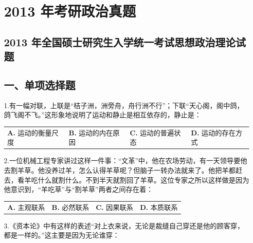 \documentclass[UTF8,11pt]{ctexart}
\begin{document}
\section*{2013 年考研政治真题}
\subsection*{2013 年全国硕士研究生入学统一考试思想政治理论试题}

\subsection*{一、单项选择题}

1.有一幅对联，上联是“桔子洲，洲旁舟，舟行洲不行”；下联“天心阁，阁中鸽，鸽飞阁不飞。”这形象地说明了运动和静止是相互依存的，静止是：


\begin{center}\begin{tabular}{>{\raggedright\arraybackslash}p{\dimexpr(\linewidth-8\tabcolsep)/4\relax}>{\raggedright\arraybackslash}p{\dimexpr(\linewidth-8\tabcolsep)/4\relax}>{\raggedright\arraybackslash}p{\dimexpr(\linewidth-8\tabcolsep)/4\relax}>{\raggedright\arraybackslash}p{\dimexpr(\linewidth-8\tabcolsep)/4\relax}}
\textbf{A.} 运动的衡量尺度 & \textbf{B.} 运动的内在原因 & \textbf{C.} 运动的普遍状态 & \textbf{D.} 运动的存在方式\\[.35em]\end{tabular}\end{center}

2.一位机械工程专家讲过这样一件事：“文革”中，他在农场劳动，有一天领导要他去割羊草。他没养过羊，怎么认得羊草呢？但脑子一转办法就来了。他把羊都赶去，看羊吃什么就割什么。不到半天就割回了羊草。这位专家之所以这样做是因为他意识到，“羊吃草”与“割羊草”两者之间存在着：


\begin{center}\begin{tabular}{>{\raggedright\arraybackslash}p{\dimexpr(\linewidth-8\tabcolsep)/4\relax}>{\raggedright\arraybackslash}p{\dimexpr(\linewidth-8\tabcolsep)/4\relax}>{\raggedright\arraybackslash}p{\dimexpr(\linewidth-8\tabcolsep)/4\relax}>{\raggedright\arraybackslash}p{\dimexpr(\linewidth-8\tabcolsep)/4\relax}}
\textbf{A.} 主观联系 & \textbf{B.} 必然联系 & \textbf{C.} 因果联系 & \textbf{D.} 本质联系\\[.35em]\end{tabular}\end{center}

3.《资本论》中有这样的表述“对上衣来说，无论是裁缝自己穿还是他的顾客穿，都是一样的。”这主要是因为无论谁穿：
\end{document}
